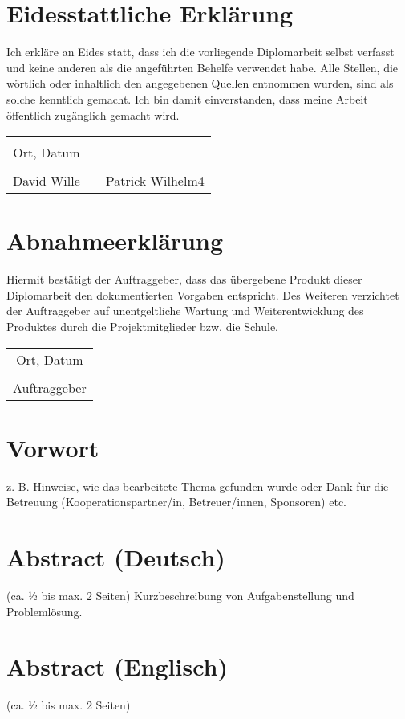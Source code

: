 \chapter*{Eidesstattliche Erklärung}
Ich erkläre an Eides statt, dass ich die vorliegende Diplomarbeit selbst verfasst und keine anderen als die angeführten Behelfe verwendet habe. Alle Stellen, die wörtlich oder inhaltlich den angegebenen Quellen entnommen wurden, sind als solche kenntlich gemacht.
Ich bin damit einverstanden, dass meine Arbeit öffentlich zugänglich gemacht wird.

\vspace{1cm}
\begin{tabular}{c c c}
	& \hspace{4cm} & \\\cline{1-1}
	Ort, Datum & & \\
	\vspace{2cm}
	& & \\\cline{1-1}\cline{3-3}
	David Wille & & Patrick Wilhelm4 \\ 
	
\end{tabular}

\chapter*{Abnahmeerklärung}
Hiermit bestätigt der Auftraggeber, dass das übergebene Produkt dieser Diplomarbeit den dokumentierten Vorgaben entspricht. Des Weiteren verzichtet der Auftraggeber auf unentgeltliche Wartung und Weiterentwicklung des Produktes durch die Projektmitglieder bzw. die Schule.

\vspace{1cm}
\begin{tabular}{c}
	\\\cline{1-1}
	Ort, Datum\\
	\vspace{2cm}
	\\\cline{1-1}
	Auftraggeber
\end{tabular}	

\chapter*{Vorwort}
z. B. Hinweise, wie das bearbeitete Thema gefunden wurde oder Dank für die Betreuung (Kooperationspartner/in, Betreuer/innen, Sponsoren) etc.


\chapter*{Abstract (Deutsch)}
(ca. ½ bis max. 2 Seiten)
Kurzbeschreibung von Aufgabenstellung und Problemlösung.

\chapter*{Abstract (Englisch)}
(ca. ½ bis max. 2 Seiten)